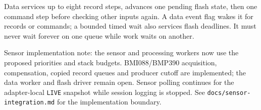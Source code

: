 Data services up to eight record steps, advances one pending flash state, then one command step before checking other inputs again. A data event flag wakes it for records or commands; a bounded timed wait also services flash deadlines. It must never wait forever on one queue while work waits on another.

Sensor implementation note: the sensor and processing workers now use the proposed priorities and stack budgets. BMI088/BMP390 acquisition, compensation, copied record queues and producer cutoff are implemented; the data worker and flash driver remain open. Sensor polling continues for the adapter-local \texttt{LIVE} snapshot while session logging is stopped. See \texttt{docs/sensor-integration.md} for the implementation boundary.
